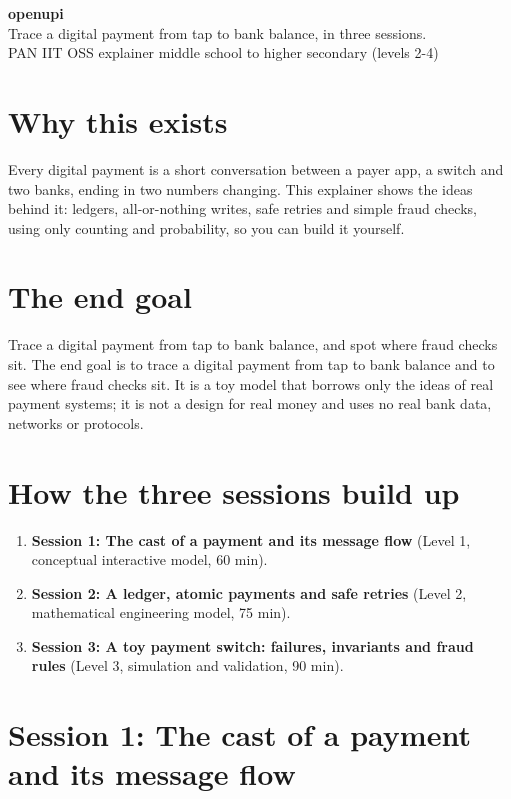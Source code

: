 \documentclass[11pt,a4paper]{article}
\begin{document}
\begin{center}{\LARGE\bfseries openupi}\\[0.4em]{\large Trace a digital payment from tap to bank balance, in three sessions.}\\[0.2em]\small PAN IIT OSS explainer \textbullet{} middle school to higher secondary (levels 2-4)\end{center}

\section*{Why this exists}
Every digital payment is a short conversation between a payer app, a switch and two banks, ending in two numbers changing. This explainer shows the ideas behind it: ledgers, all-or-nothing writes, safe retries and simple fraud checks, using only counting and probability, so you can build it yourself.

\section*{The end goal}
Trace a digital payment from tap to bank balance, and spot where fraud checks sit. The end goal is to trace a digital payment from tap to bank balance and to see where fraud checks sit. It is a toy model that borrows only the ideas of real payment systems; it is not a design for real money and uses no real bank data, networks or protocols.

\section*{How the three sessions build up}
\begin{enumerate}[nosep]
\item \textbf{Session 1: The cast of a payment and its message flow} (Level 1, conceptual interactive model, 60 min).
\item \textbf{Session 2: A ledger, atomic payments and safe retries} (Level 2, mathematical engineering model, 75 min).
\item \textbf{Session 3: A toy payment switch: failures, invariants and fraud rules} (Level 3, simulation and validation, 90 min).
\end{enumerate}

\section{Session 1: The cast of a payment and its message flow}
\end{document}
